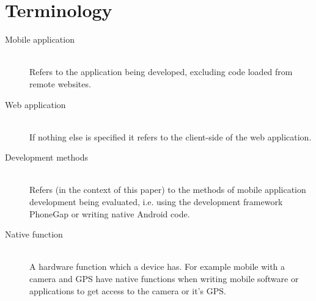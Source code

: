\section{Terminology}
\begin{description}
  \item[Mobile application] \hfill \\
    Refers to the application being developed, excluding code loaded from remote        websites.
  \item[Web application] \hfill \\
    If nothing else is specified it refers to the client-side of the web application.
  \item[Development methods] \hfill \\
    Refers (in the context of this paper) to the methods of mobile application          development being evaluated, i.e. using the development framework PhoneGap or       writing native Android code.
  \item[Native function] \hfill \\
     A hardware function which a device has. For example mobile with a camera and GPS have native functions when writing mobile software or applications to get access to the camera or it's GPS.
\end{description}
